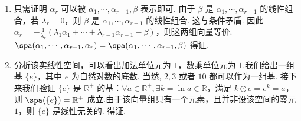 \begin{enumerate}
    \item 只需证明 $\alpha_r$ 可以被 $\alpha_1,\cdots,\alpha_{r-1},\beta$ 表示即可. 由于 $\beta$ 是 $\alpha_1,\cdots,\alpha_{r-1}$ 的线性组合，若 $\lambda_r=0$，则 $\beta$ 是 $\alpha_1,\cdots,\alpha_{r-1}$ 的线性组合. 这与条件矛盾. 因此 $\alpha_r=-\frac 1{\lambda_r}(\lambda_1\alpha_1+\cdots+\lambda_{r-1}\alpha_{r-1}-\beta)$，则这两组向量等价. $\spa(\alpha_1,\cdots,\alpha_{r-1},\alpha_r)=\spa(\alpha_1,\cdots,\alpha_{r-1},\beta)$ 得证.

    \item 分析该实线性空间，可以看出加法单位元为 $1$，数乘单位元为 $1$.我们给出一组基 $\{e\}$，其中 $e$ 为自然对数的底数. 当然, $2,3$ 或者 $10$ 都可以作为一组基. 接下来我们验证 $\{e\}$ 是 $\mathbb R^+$ 的基：$\forall a\in \mathbb R^+,\exists k=\ln a\in\mathbb R$，满足 $k\odot e=e^k=a$，则 $\spa(\{e\})=\mathbb R^+$ 成立.由于该向量组只有一个元素，且并非设该空间的零元 $1$，则 $\{e\}$ 是线性无关的. 得证.
\end{enumerate}

